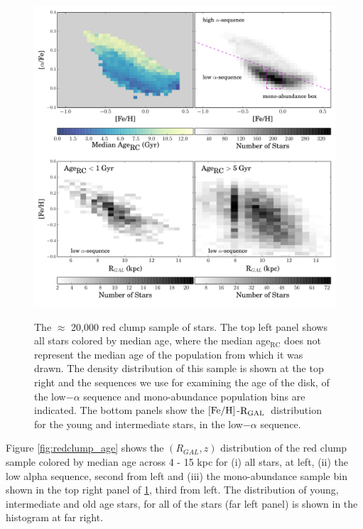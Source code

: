 \documentclass[12pt, preprint]{aastex}
\newcommand{\feh}{\mbox{$\rm [Fe/H]$}}
\newcommand{\rgal}{\mbox{$\rm R_{GAL}$}}
\begin{document}
\begin{figure}[h!]
\centering
 \includegraphics[scale=0.5]{./plots/redclump_4panel.pdf}\\
    \caption{The $\approx$ 20,000 red clump sample of stars. The top left panel shows all stars colored by median age, where the median age$_{\mbox{RC}}$ does not represent the median age of the population from which it was drawn. The density distribution of this sample is shown at the top right and the sequences we use for examining the age of the disk, of the low$-\alpha$ sequence and mono-abundance population bins are indicated. The bottom panels show the \feh-\rgal\ distribution for the young and intermediate stars, in the low$-\alpha$ sequence.}
\label{fig:redclump}
\end{figure}

Figure \ref{fig:redclump_age} shows the $(R_{GAL},z)$ distribution of the red clump sample colored by median age across 4 - 15 kpc for  (i) all stars, at left, (ii) the low alpha sequence, second from left and (iii) the mono-abundance sample bin shown in the top right panel of \ref{fig:redclump}, third from left. The distribution of young, intermediate and old age stars, for all of the stars (far left panel) is shown in the histogram at far right. 
\end{document}

